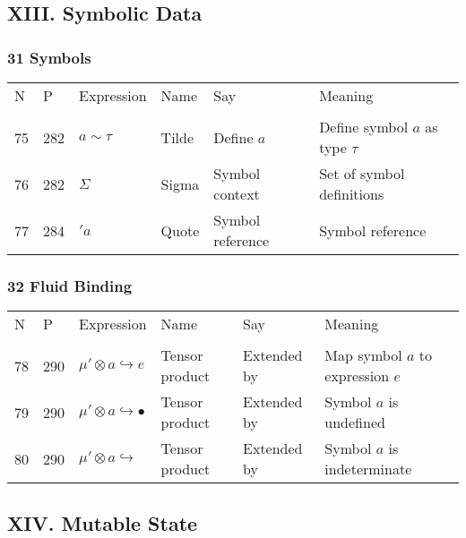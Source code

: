 \documentclass[12pt]{article}
\begin{document}
\subsection*{XIII. Symbolic Data}
\subsubsection*{31 Symbols}
\begin{tabular}[b] {p{} p{} p{} p{} 
p{} p{}}
N & P & Expression & Name & Say & Meaning \\ \\

75 & 282 & $a \sim \tau$ & Tilde & Define $a$ & Define symbol $a$ as type $\tau$ \\
76 & 282 & $\Sigma$ & Sigma & Symbol context & Set of symbol definitions \\
77 & 284 & $'a$ & Quote & Symbol reference & Symbol reference \\
\end{tabular}

\subsubsection*{32 Fluid Binding}
\begin{tabular}[b] {p{} p{} p{} p{} 
p{} p{}}
N & P & Expression & Name & Say & Meaning \\ \\
78 & 290 & $\mu ' \otimes a \hookrightarrow e$ & Tensor product & Extended by &  Map symbol $a$ to expression $e$\\
79 & 290 & $\mu ' \otimes a \hookrightarrow \bullet$ & Tensor product & Extended by &  Symbol $a$ is undefined\\
80 & 290 & $\mu ' \otimes a \hookrightarrow $ \underline{ } & Tensor product & Extended by &  Symbol $a$ is indeterminate\\

\end{tabular}

\subsection*{XIV. Mutable State}
\end{document}
